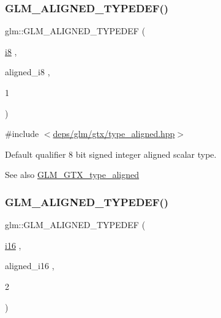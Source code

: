 \subsubsection{\texorpdfstring{G\+L\+M\+\_\+\+A\+L\+I\+G\+N\+E\+D\+\_\+\+T\+Y\+P\+E\+D\+E\+F()}{GLM\_ALIGNED\_TYPEDEF()}\hspace{0.1cm}{\footnotesize\ttfamily [45/209]}}
{\footnotesize\ttfamily glm\+::\+G\+L\+M\+\_\+\+A\+L\+I\+G\+N\+E\+D\+\_\+\+T\+Y\+P\+E\+D\+EF (\begin{DoxyParamCaption}\item[{\hyperlink{group__gtc__type__precision_gaae064be68b7d36cd7910c16e8ad18bba}{i8}}]{,  }\item[{aligned\+\_\+i8}]{,  }\item[{1}]{ }\end{DoxyParamCaption})}



{\ttfamily \#include $<$\hyperlink{gtx_2type__aligned_8hpp}{deps/glm/gtx/type\+\_\+aligned.\+hpp}$>$}

Default qualifier 8 bit signed integer aligned scalar type. \begin{DoxySeeAlso}{See also}
\hyperlink{group__gtx__type__aligned}{G\+L\+M\+\_\+\+G\+T\+X\+\_\+type\+\_\+aligned} 
\end{DoxySeeAlso}
\mbox{\label{group__gtx__type__aligned_gabd786bdc20a11c8cb05c92c8212e28d3}} 
\subsubsection{\texorpdfstring{G\+L\+M\+\_\+\+A\+L\+I\+G\+N\+E\+D\+\_\+\+T\+Y\+P\+E\+D\+E\+F()}{GLM\_ALIGNED\_TYPEDEF()}\hspace{0.1cm}{\footnotesize\ttfamily [46/209]}}
{\footnotesize\ttfamily glm\+::\+G\+L\+M\+\_\+\+A\+L\+I\+G\+N\+E\+D\+\_\+\+T\+Y\+P\+E\+D\+EF (\begin{DoxyParamCaption}\item[{\hyperlink{group__gtc__type__precision_ga35e5542ca05b29cc256fdafb8503d1fd}{i16}}]{,  }\item[{aligned\+\_\+i16}]{,  }\item[{2}]{ }\end{DoxyParamCaption})}



